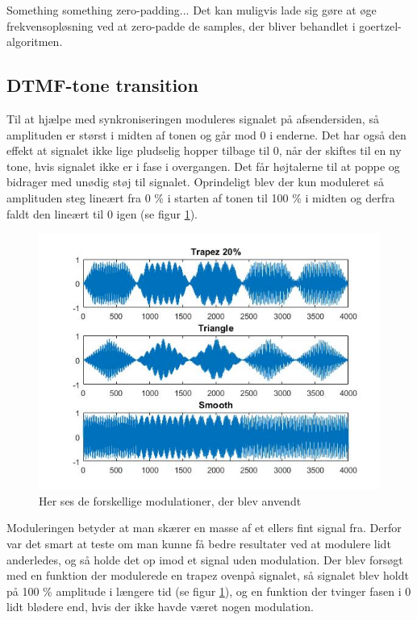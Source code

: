 Something something zero-padding... Det kan muligvis lade sig gøre at øge frekvensopløsning ved at zero-padde de samples, der bliver behandlet i goertzel-algoritmen.

\subsection{DTMF-tone transition} \label{sec:ToneTransition}

Til at hjælpe med synkroniseringen moduleres signalet på afsendersiden, så amplituden er størst i midten af tonen og går mod 0 i enderne. Det har også den effekt at signalet ikke lige pludselig hopper tilbage til 0, når der skiftes til en ny tone, hvis signalet ikke er i fase i overgangen. Det får højtalerne til at poppe og bidrager med unødig støj til signalet. Oprindeligt blev der kun moduleret så amplituden steg lineært fra 0 \% i starten af tonen til 100 \% i midten og derfra faldt den lineært til 0 igen (se figur \ref{fig:modulation}). 

\begin{figure}[h!]
\centering
\includegraphics[scale=0.6]{Billeder/Modulation.PNG}
\caption{Her ses de forskellige modulationer, der blev anvendt}
\label{fig:modulation}
\end{figure} 

Moduleringen betyder at man skærer en masse af et ellers fint signal fra. Derfor var det smart at teste om man kunne få bedre resultater ved at modulere lidt anderledes, og så holde det op imod et signal uden modulation. Der blev forsøgt med en funktion der modulerede en trapez ovenpå signalet, så signalet blev holdt på 100 \% amplitude i længere tid (se figur \ref{fig:modulation}), og en funktion der tvinger fasen i 0 lidt blødere end, hvis der ikke havde været nogen modulation. 

